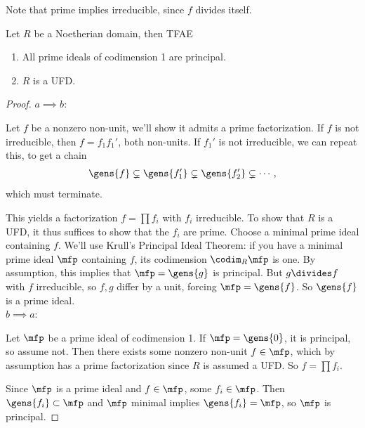 Note that prime implies irreducible, since \(f\) divides itself.

\begin{proposition}[?]

Let \(R\) be a Noetherian domain, then TFAE

\begin{enumerate}
\def\labelenumi{\alph{enumi}.}
\item
  All prime ideals of codimension 1 are principal.
\item
  \(R\) is a UFD.
\end{enumerate}

\end{proposition}

\begin{proof}

\(a\implies b\):

Let \(f\) be a nonzero non-unit, we'll show it admits a prime
factorization. If \(f\) is not irreducible, then \(f = f_1 f_1'\), both
non-units. If \(f_1'\) is not irreducible, we can repeat this, to get a
chain
\begin{align*}  
\gens{f} \subsetneq \gens{f_1'} \subsetneq \gens{f_2'} \subsetneq \cdots
,\end{align*} which must terminate.

This yields a factorization \(f = \prod f_i\) with \(f_i\) irreducible.
To show that \(R\) is a UFD, it thus suffices to show that the \(f_i\)
are prime. Choose a minimal prime ideal containing \(f\). We'll use
Krull's Principal Ideal Theorem: if you have a minimal prime ideal
\(\mfp\) containing \(f\), its codimension \(\codim_R \mfp\) is one. By
assumption, this implies that \(\mfp = \gens{g}\) is principal. But
\(g\divides f\) with \(f\) irreducible, so \(f,g\) differ by a unit,
forcing \(\mfp = \gens{f}\). So \(\gens{f}\) is a prime ideal.\\

\(b\implies a\):

Let \(\mfp\) be a prime ideal of codimension 1. If \(\mfp = \gens{0}\),
it is principal, so assume not. Then there exists some nonzero non-unit
\(f\in \mfp\), which by assumption has a prime factorization since \(R\)
is assumed a UFD. So \(f=\prod f_i\).

Since \(\mfp\) is a prime ideal and \(f\in\mfp\), some \(f_i\in \mfp\).
Then \(\gens{f_i} \subset \mfp\) and \(\mfp\) minimal implies
\(\gens{f_i} = \mfp\), so \(\mfp\) is principal.

\end{proof}

